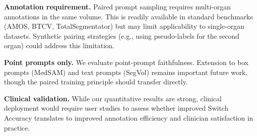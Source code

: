\textbf{Annotation requirement.} Paired prompt sampling requires multi-organ annotations in the same volume. This is readily available in standard benchmarks (AMOS, BTCV, TotalSegmentator) but may limit applicability to single-organ datasets. Synthetic pairing strategies (e.g., using pseudo-labels for the second organ) could address this limitation.

\textbf{Point prompts only.} We evaluate point-prompt faithfulness. Extension to box prompts (MedSAM) and text prompts (SegVol) remains important future work, though the paired training principle should transfer directly.

\textbf{Clinical validation.} While our quantitative results are strong, clinical deployment would require user studies to assess whether improved Switch Accuracy translates to improved annotation efficiency and clinician satisfaction in practice.

